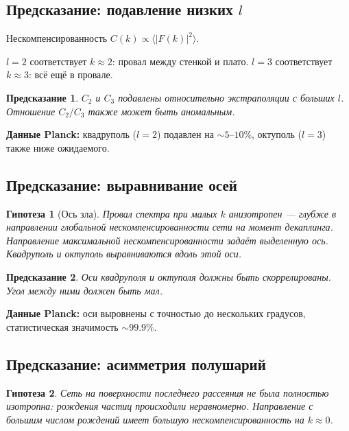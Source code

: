 \documentclass[11pt,a4paper]{article}
\newtheorem{hypothesis}{Гипотеза}[section]
\newtheorem{prediction}{Предсказание}[section]
\theoremstyle{definition}
\begin{document}
\subsection{Предсказание: подавление низких $l$}

Нескомпенсированность $C(k) \propto \langle |F(k)|^2 \rangle$.

$l = 2$ соответствует $k \approx 2$: провал между стенкой и плато.
$l = 3$ соответствует $k \approx 3$: всё ещё в провале.

\begin{prediction}
$C_2$ и $C_3$ подавлены относительно экстраполяции с больших $l$. Отношение $C_2/C_3$ также может быть аномальным.
\end{prediction}

\textbf{Данные Planck:} квадруполь ($l=2$) подавлен на $\sim 5$--$10\%$, октуполь ($l=3$) также ниже ожидаемого.

\subsection{Предсказание: выравнивание осей}

\begin{hypothesis}[Ось зла]
Провал спектра при малых $k$ анизотропен --- глубже в направлении глобальной нескомпенсированности сети на момент декаплинга. Направление максимальной нескомпенсированности задаёт выделенную ось. Квадруполь и октуполь выравниваются вдоль этой оси.
\end{hypothesis}

\begin{prediction}
Оси квадруполя и октуполя должны быть скоррелированы. Угол между ними должен быть мал.
\end{prediction}

\textbf{Данные Planck:} оси выровнены с точностью до нескольких градусов, статистическая значимость $\sim 99.9\%$.

\subsection{Предсказание: асимметрия полушарий}

\begin{hypothesis}
Сеть на поверхности последнего рассеяния не была полностью изотропна: рождения частиц происходили неравномерно. Направление с большим числом рождений имеет большую нескомпенсированность на $k \approx 0$.
\end{hypothesis}
\end{document}
